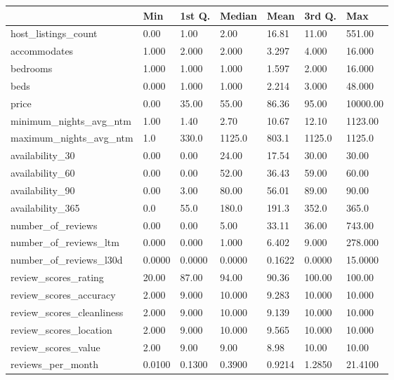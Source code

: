 
\begin{tabular}[t]{lllllll}
\toprule
  & Min & 1st Q. & Median & Mean & 3rd Q. & Max\\
\midrule
host\_listings\_count & 0.00 & 1.00 & 2.00 & 16.81 & 11.00 & 551.00\\
accommodates & 1.000 & 2.000 & 2.000 & 3.297 & 4.000 & 16.000\\
bedrooms & 1.000 & 1.000 & 1.000 & 1.597 & 2.000 & 16.000\\
beds & 0.000 & 1.000 & 1.000 & 2.214 & 3.000 & 48.000\\
price & 0.00 & 35.00 & 55.00 & 86.36 & 95.00 & 10000.00\\
\addlinespace
minimum\_nights\_avg\_ntm & 1.00 & 1.40 & 2.70 & 10.67 & 12.10 & 1123.00\\
maximum\_nights\_avg\_ntm & 1.0 & 330.0 & 1125.0 & 803.1 & 1125.0 & 1125.0\\
availability\_30 & 0.00 & 0.00 & 24.00 & 17.54 & 30.00 & 30.00\\
availability\_60 & 0.00 & 0.00 & 52.00 & 36.43 & 59.00 & 60.00\\
availability\_90 & 0.00 & 3.00 & 80.00 & 56.01 & 89.00 & 90.00\\
\addlinespace
availability\_365 & 0.0 & 55.0 & 180.0 & 191.3 & 352.0 & 365.0\\
number\_of\_reviews & 0.00 & 0.00 & 5.00 & 33.11 & 36.00 & 743.00\\
number\_of\_reviews\_ltm & 0.000 & 0.000 & 1.000 & 6.402 & 9.000 & 278.000\\
number\_of\_reviews\_l30d & 0.0000 & 0.0000 & 0.0000 & 0.1622 & 0.0000 & 15.0000\\
review\_scores\_rating & 20.00 & 87.00 & 94.00 & 90.36 & 100.00 & 100.00\\
\addlinespace
review\_scores\_accuracy & 2.000 & 9.000 & 10.000 & 9.283 & 10.000 & 10.000\\
review\_scores\_cleanliness & 2.000 & 9.000 & 10.000 & 9.139 & 10.000 & 10.000\\
review\_scores\_location & 2.000 & 9.000 & 10.000 & 9.565 & 10.000 & 10.000\\
review\_scores\_value & 2.00 & 9.00 & 9.00 & 8.98 & 10.00 & 10.00\\
reviews\_per\_month & 0.0100 & 0.1300 & 0.3900 & 0.9214 & 1.2850 & 21.4100\\
\bottomrule
\end{tabular}